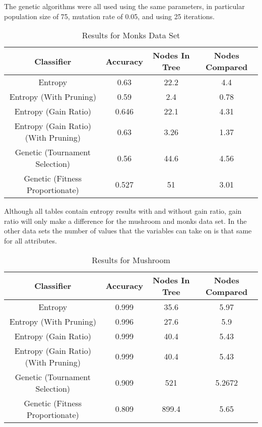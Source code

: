 \documentclass[12pt,letterpaper]{article}
\begin{document}
The genetic algorithms were all used using the same parameters, in particular population size of 75, mutation rate of 0.05, and using 25 iterations. 

\begin{table}[h]
\begin{tabular}{ |c|c|c|c| }
\hline
Classifier  &   Accuracy & Nodes In Tree  & Nodes Compared\\
\hline
Entropy & 0.63 & 22.2 &4.4 \\
Entropy (With Pruning) &0.59 & 2.4 & 0.78 \\
Entropy (Gain Ratio) & 0.646 & 22.1 & 4.31 \\
Entropy (Gain Ratio) (With Pruning) & 0.63 & 3.26 & 1.37 \\
\hline
Genetic (Tournament Selection) & 0.56 &44.6 &4.56\\
Genetic (Fitness Proportionate) & 0.527 & 51 & 3.01 \\
\hline
\end{tabular}
\caption{Results for Monks Data Set }
\end{table}

Although all tables contain entropy results with and without gain ratio, gain ratio will only make a difference for the mushroom and monks data set. In the other data sets the number of values that the variables can take on is that same for all attributes. 

\begin{table}[h]
\begin{tabular}{ |c|c|c|c| }
\hline
Classifier  &   Accuracy & Nodes In Tree  & Nodes Compared\\
\hline
Entropy & 0.999 & 35.6 &5.97 \\
Entropy (With Pruning) &0.996 & 27.6 & 5.9 \\
Entropy (Gain Ratio) & 0.999 & 40.4 &  5.43 \\
Entropy (Gain Ratio) (With Pruning) & 0.999 & 40.4 & 5.43 \\
\hline
Genetic (Tournament Selection) &0.909 &521 &5.2672\\
Genetic (Fitness Proportionate) & 0.809 & 899.4 & 5.65 \\
\hline
\end{tabular}
\caption{Results for Mushroom }
\end{table}
\end{document}
